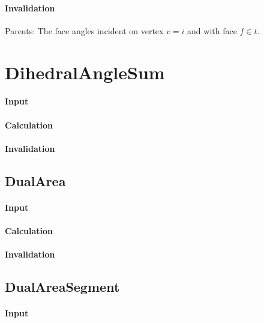 \paragraph{Invalidation}

\bigskip Parents: The face angles incident on vertex $v=i$ and with face $%
f\in t$.

\section{DihedralAngleSum}

\paragraph{Input}

\paragraph{Calculation}

\paragraph{Invalidation}

\bigskip

\subsection{DualArea}

\paragraph{Input}

\paragraph{Calculation}

\paragraph{Invalidation}

\bigskip

\subsection{DualAreaSegment}

\paragraph{Input}

